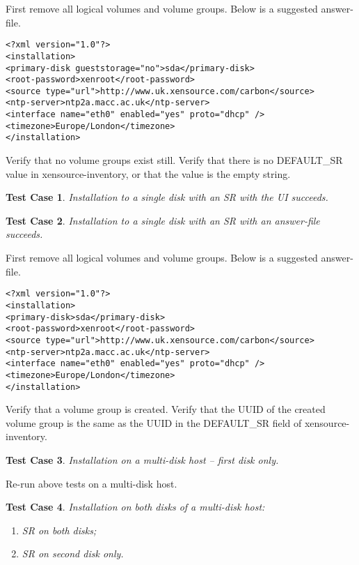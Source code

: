 \documentclass[a4paper]{article}
\newtheorem{testcase}{Test Case}
\begin{document}
First remove all logical volumes and volume groups.  Below is a
suggested answer-file.

\begin{verbatim}
<?xml version="1.0"?>
<installation>
<primary-disk gueststorage="no">sda</primary-disk>
<root-password>xenroot</root-password>
<source type="url">http://www.uk.xensource.com/carbon</source>
<ntp-server>ntp2a.macc.ac.uk</ntp-server>
<interface name="eth0" enabled="yes" proto="dhcp" />
<timezone>Europe/London</timezone>
</installation>
\end{verbatim}

Verify that no volume groups exist still.  Verify that there is no
DEFAULT\_SR value in xensource-inventory, or that the value is the
empty string.

\begin{testcase}
Installation to a single disk with an SR with the UI succeeds.
\end{testcase}

\begin{testcase}
Installation to a single disk with an SR with an answer-file succeeds.
\end{testcase}

First remove all logical volumes and volume groups.  Below is a
suggested answer-file.

\begin{verbatim}
<?xml version="1.0"?>
<installation>
<primary-disk>sda</primary-disk>
<root-password>xenroot</root-password>
<source type="url">http://www.uk.xensource.com/carbon</source>
<ntp-server>ntp2a.macc.ac.uk</ntp-server>
<interface name="eth0" enabled="yes" proto="dhcp" />
<timezone>Europe/London</timezone>
</installation>
\end{verbatim}

Verify that a volume group is created.  Verify that the UUID of the
created volume group is the same as the UUID in the DEFAULT\_SR field
of xensource-inventory.

\begin{testcase}
Installation on a multi-disk host -- first disk only.
\end{testcase}

Re-run above tests on a multi-disk host.

\begin{testcase}
Installation on both disks of a multi-disk host:
\begin{enumerate}
\item SR on both disks;
\item SR on second disk only.
\end{enumerate}
\end{testcase}
\end{document}
